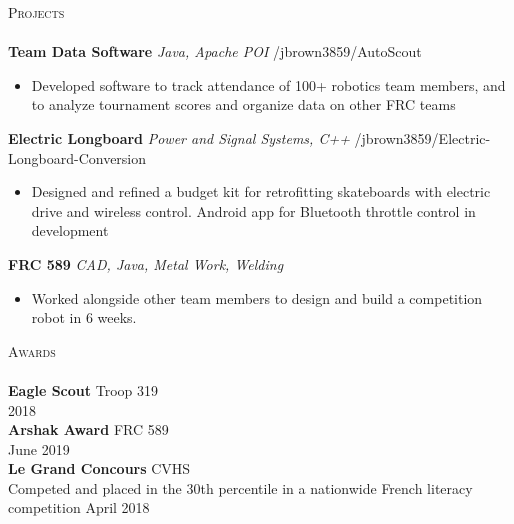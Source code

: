 \documentclass[a4paper]{article}
\newcommand{\lineunder} {
    \vspace*{-8pt} \\
    \hspace*{-18pt} \hrulefill \\
}
\newcommand{\header} [1] {
    {\hspace*{-18pt}\vspace*{6pt} \textsc{#1}}
    \vspace*{-6pt} \lineunder
}
\begin{document}
\header{Projects}
{\textbf{Team Data Software}} {\sl Java, Apache POI} \hfill /jbrown3859/AutoScout\\
\begin{itemize} \itemsep 1pt
	\item Developed software to track attendance of 100+ robotics team members, and to analyze tournament scores and organize data on other FRC teams\\
\end{itemize}
\vspace*{2mm}
{\textbf{Electric Longboard}} {\sl Power and Signal Systems, C++} \hfill /jbrown3859/Electric-Longboard-Conversion\\
\begin{itemize} \itemsep 1pt
	\item Designed and refined a budget kit for retrofitting skateboards with electric drive and wireless control. Android app for Bluetooth throttle control in development\\
\end{itemize}
\vspace*{2mm}
{\textbf{FRC 589}} {\sl CAD, Java, Metal Work, Welding} \\
\begin{itemize} \itemsep 1pt
	\item Worked alongside other team members to design and build a competition robot in 6 weeks.\\
\end{itemize}
\vspace*{2mm}

\header{Awards}
\textbf{Eagle Scout} \hfill Troop 319\\
\hfill 2018\\
\vspace*{2mm}
\textbf{Arshak Award} \hfill FRC 589\\
\hfill June 2019\\
\vspace*{2mm}
\textbf{Le Grand Concours} \hfill CVHS\\
Competed and placed in the 30th percentile in a nationwide French literacy competition \hfill April 2018\\
\vspace*{2mm}

\ 
\end{document}
